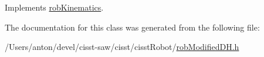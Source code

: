 Implements \hyperlink{classrob_kinematics_afbfe67b8baaed6fdee85bef681f195e1}{rob\+Kinematics}.



The documentation for this class was generated from the following file\+:\begin{DoxyCompactItemize}
\item 
/\+Users/anton/devel/cisst-\/saw/cisst/cisst\+Robot/\hyperlink{rob_modified_d_h_8h}{rob\+Modified\+D\+H.\+h}\end{DoxyCompactItemize}

